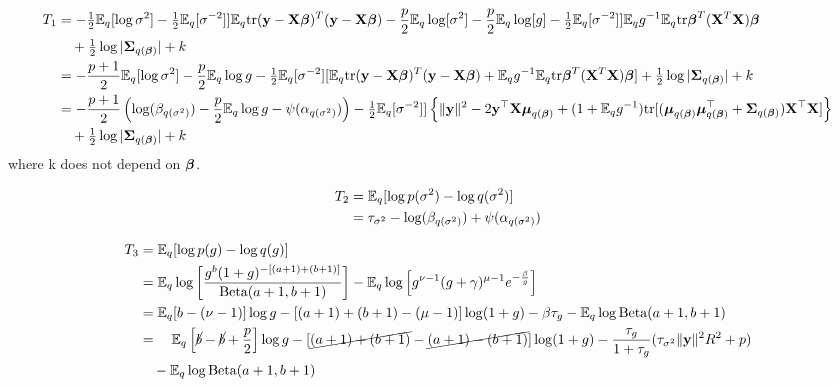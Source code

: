 \documentclass{amsart}[12pt]
\begin{document}
\begin{align*}
	T_1 & = -\tfrac{1}{2} \mathbb{E}_q [\log \sigma^2] -\tfrac{1}{2} \mathbb{E}_q [\sigma^{-2}]] \mathbb{E}_q \text{tr} ({\bf y} - {\bf X} {\boldsymbol \beta})^T ({\bf y} - {\bf X} {\boldsymbol \beta})            
	- \frac{p}{2} \mathbb{E}_q \log [\sigma^2] - \frac{p}{2} \mathbb{E}_q \log [g] - \tfrac{1}{2} \mathbb{E}_q [\sigma^{-2}]] \mathbb{E}_q g^{-1} \mathbb{E}_q \text{tr} {\boldsymbol\beta}^T ({\bf X}^T {\bf X}) {\boldsymbol \beta} \\
	    & \quad + \tfrac{1}{2} \log |{\boldsymbol \Sigma}_{q({\boldsymbol \beta})}| + k                                                                         \\
	    & = -\frac{p + 1}{2} \mathbb{E}_q [\log \sigma^2] - \frac{p}{2} \mathbb{E}_q \log g                                                    
	-\tfrac{1}{2} \mathbb{E}_q [\sigma^{-2}] [\mathbb{E}_q \text{tr} ({\bf y} - {\bf X} {\boldsymbol \beta})^T ({\bf y} - {\bf X} {\boldsymbol \beta}) + \mathbb{E}_q g^{-1} \mathbb{E}_q \text{tr} {\boldsymbol\beta}^T ({\bf X}^T {\bf X}) {\boldsymbol \beta}]
	+ \tfrac{1}{2} \log |{\boldsymbol \Sigma}_{q({\boldsymbol \beta})}| + k \\
	    & = -\frac{p + 1}{2} \left (\log (\beta_{q(\sigma^2)}) - \frac{p}{2} \mathbb{E}_q \log g - \psi(\alpha_{q(\sigma^2)}) \right ) 
	- \tfrac{1}{2} \mathbb{E}_q [\sigma^{-2}]] \left \{ \| {\bf y}\|^2 - 2 {\bf y}^\top {\bf X} {\boldsymbol\mu}_{q({\boldsymbol \beta})} + (1 + \mathbb{E}_q g^{-1}) \text{tr}[({\boldsymbol \mu}_{q({\boldsymbol \beta})} {\boldsymbol \mu}_{q({\boldsymbol \beta})}^\top + {\boldsymbol \Sigma}_{q({\boldsymbol \beta})}) {\bf X}^\top {\bf X}] \right \}  \\
	    & \quad + \tfrac{1}{2} \log |{\boldsymbol \Sigma}_{q({\boldsymbol \beta})}| + k                                                                         
\end{align*}
where k does not depend on ${\boldsymbol \beta}$.

\begin{align*}
	T_2 & = \mathbb{E}_q [\log p(\sigma^2) - \log q(\sigma^2)]                               \\
	    & = \tau_{\sigma^2} - \log(\beta_{q(\sigma^2)}) + \psi(\alpha_{q(\sigma^2)}) 
\end{align*}

\begin{align*}
	T_3 & = \mathbb{E}_q [\log p(g) - \log q(g)]                                                                                                                     \\
	    & = \mathbb{E}_q \log \left [ \frac{g^b (1 + g)^{-[(a + 1) + (b + 1)]}}{\text{Beta}(a + 1, b + 1)} \right ] -                                                      
	\mathbb{E}_q \log \left [ g^{\nu - 1} (g + \gamma)^{\mu - 1} e^{-\frac{\beta}{g}} \right ] \\
	    & = \mathbb{E}_q [b - (\nu - 1)] \log g - [(a + 1) + (b + 1) - (\mu - 1)] \log (1 + g) - \beta \tau_g                                                        
	- \mathbb{E}_q \log \text{Beta}(a + 1,  b + 1) \\
	    & = \quad \mathbb{E}_q \left [\cancel{b} - \cancel{b} + \frac{p}{2} \right ] \log g - [\cancel{(a + 1) + (b + 1)} - \cancel{(a + 1) - (b + 1)}] \log (1 + g) 
	- \frac{\tau_g}{1 + \tau_g} (\tau_{\sigma^2} \|{\bf y}\|^2 R^2 + p)\\
	    & \quad - \mathbb{E}_q \log \text{Beta}(a + 1,  b + 1)                                                                                                             \\
\end{align*}
\end{document}
